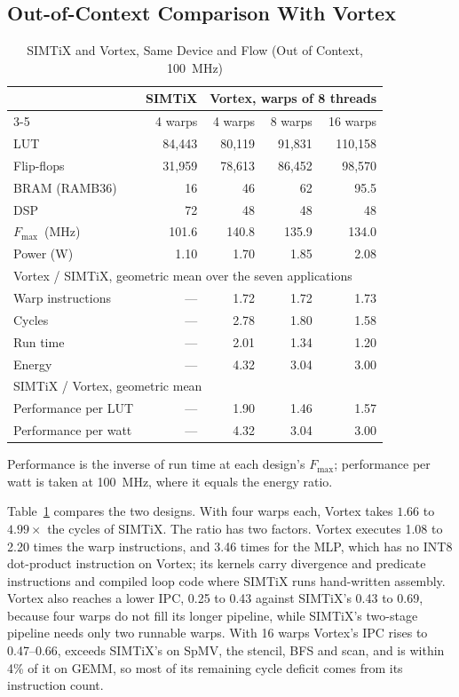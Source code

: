 \documentclass[journal]{IEEEtran}
\newcommand{\Fmax}{$F_{\max}$}
\begin{document}
\subsection{Out-of-Context Comparison With Vortex}\label{sec:evalvortex}
\begin{table}[t]
\caption{SIMTiX and Vortex, Same Device and Flow (Out of Context, 100~MHz)}
\label{tab:vortex}
\centering\footnotesize
\begin{tabular}{lrrrr}
\toprule
 & SIMTiX & \multicolumn{3}{c}{Vortex, warps of 8 threads}\\
\cmidrule(lr){3-5}
 & 4 warps & 4 warps & 8 warps & 16 warps\\
\midrule
LUT            & 84,443 & 80,119 & 91,831 & 110,158\\
Flip-flops     & 31,959 & 78,613 & 86,452 & 98,570\\
BRAM (RAMB36)  & 16 & 46 & 62 & 95.5\\
DSP            & 72 & 48 & 48 & 48\\
\Fmax\ (MHz)   & 101.6 & 140.8 & 135.9 & 134.0\\
Power (W)      & 1.10 & 1.70 & 1.85 & 2.08\\
\midrule
\multicolumn{5}{l}{Vortex / SIMTiX, geometric mean over the seven applications}\\
Warp instructions & --- & 1.72 & 1.72 & 1.73\\
Cycles         & --- & 2.78 & 1.80 & 1.58\\
Run time       & --- & 2.01 & 1.34 & 1.20\\
Energy         & --- & 4.32 & 3.04 & 3.00\\
\midrule
\multicolumn{5}{l}{SIMTiX / Vortex, geometric mean}\\
Performance per LUT  & --- & 1.90 & 1.46 & 1.57\\
Performance per watt & --- & 4.32 & 3.04 & 3.00\\
\bottomrule
\end{tabular}

\vspace{2pt}
\begin{minipage}{\columnwidth}\footnotesize
Performance is the inverse of run time at each design's \Fmax; performance per
watt is taken at 100~MHz, where it equals the energy ratio.
\end{minipage}
\end{table}

Table~\ref{tab:vortex} compares the two designs. With
four warps each, Vortex takes $1.66$ to $4.99\times$ the cycles of SIMTiX. The
ratio has two factors. Vortex executes 1.08 to 2.20 times the warp instructions,
and 3.46 times for the MLP, which has no INT8 dot-product instruction on Vortex;
its kernels carry divergence and predicate instructions and compiled loop code
where SIMTiX runs hand-written assembly. Vortex also reaches a lower IPC, 0.25 to
0.43 against SIMTiX's 0.43 to 0.69, because four warps do not fill its longer
pipeline, while SIMTiX's two-stage pipeline needs only two runnable warps. With 16
warps Vortex's IPC rises to 0.47--0.66, exceeds SIMTiX's on SpMV, the stencil,
BFS and scan, and is within 4\% of it on GEMM, so most of its remaining cycle
deficit comes from its instruction count.
\end{document}
